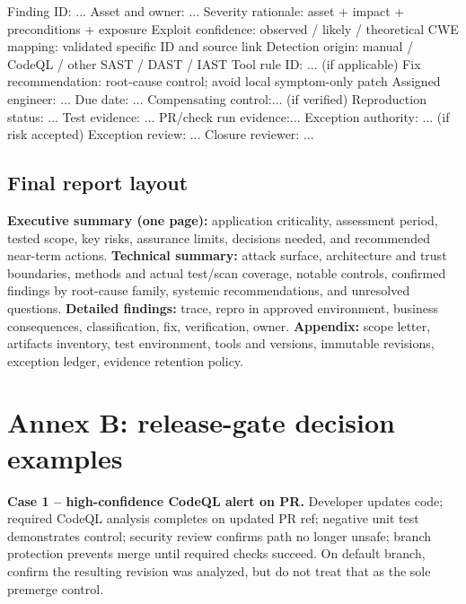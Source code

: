 \documentclass[
  letterpaper,
]{article}
\newenvironment{Shaded}{}{}
\newcommand{\NormalTok}[1]{#1}
\begin{document}
\begin{Shaded}
\begin{Highlighting}[]
\NormalTok{Finding ID:          ...}
\NormalTok{Asset and owner:     ...}
\NormalTok{Severity rationale:  asset + impact + preconditions + exposure}
\NormalTok{Exploit confidence:  observed / likely / theoretical}
\NormalTok{CWE mapping:         validated specific ID and source link}
\NormalTok{Detection origin:    manual / CodeQL / other SAST / DAST / IAST}
\NormalTok{Tool rule ID:        ... (if applicable)}
\NormalTok{Fix recommendation:  root{-}cause control; avoid local symptom{-}only patch}
\NormalTok{Assigned engineer:   ...}
\NormalTok{Due date:            ...}
\NormalTok{Compensating control:... (if verified)}
\NormalTok{Reproduction status: ...}
\NormalTok{Test evidence:       ...}
\NormalTok{PR/check run evidence:...}
\NormalTok{Exception authority: ... (if risk accepted)}
\NormalTok{Exception review:    ...}
\NormalTok{Closure reviewer:    ...}
\end{Highlighting}
\end{Shaded}

\subsection{Final report layout}\label{final-report-layout}

\textbf{Executive summary (one page):} application criticality,
assessment period, tested scope, key risks, assurance limits, decisions
needed, and recommended near-term actions. \textbf{Technical summary:}
attack surface, architecture and trust boundaries, methods and actual
test/scan coverage, notable controls, confirmed findings by root-cause
family, systemic recommendations, and unresolved questions.
\textbf{Detailed findings:} trace, repro in approved environment,
business consequences, classification, fix, verification, owner.
\textbf{Appendix:} scope letter, artifacts inventory, test environment,
tools and versions, immutable revisions, exception ledger, evidence
retention policy.

\section{Annex B: release-gate decision
examples}\label{annex-b-release-gate-decision-examples}

\textbf{Case 1 -- high-confidence CodeQL alert on PR.} Developer updates
code; required CodeQL analysis completes on updated PR ref; negative
unit test demonstrates control; security review confirms path no longer
unsafe; branch protection prevents merge until required checks succeed.
On default branch, confirm the resulting revision was analyzed, but do
not treat that as the sole premerge control.
\end{document}
